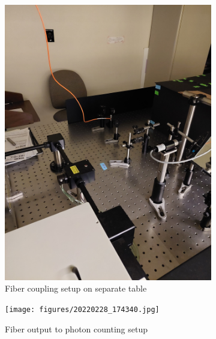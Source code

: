 \documentclass[a4paper]{article}
\begin{document}
\begin{figure}
     \centering
     \begin{subfigure}[t]{0.25\textwidth}
         \centering
         \includegraphics[angle=270,origin=c,width=\textwidth]{figures/20220228_174444.jpg}
         \caption{Fiber coupling setup on separate table}
         \label{fig:nkt_fiber_coupling}
     \end{subfigure}
     \hfill
     \begin{subfigure}[t]{0.25\textwidth}
         \centering
         \texttt{[image: figures/20220228\_174340.jpg]}
         \caption{Fiber output to photon counting setup}
         \label{fig:fiber_output}
     \end{subfigure}
     \hfill
     \begin{subfigure}[t]{0.4\textwidth}
         \centering

\end{subfigure}
\end{figure}
\end{document}
